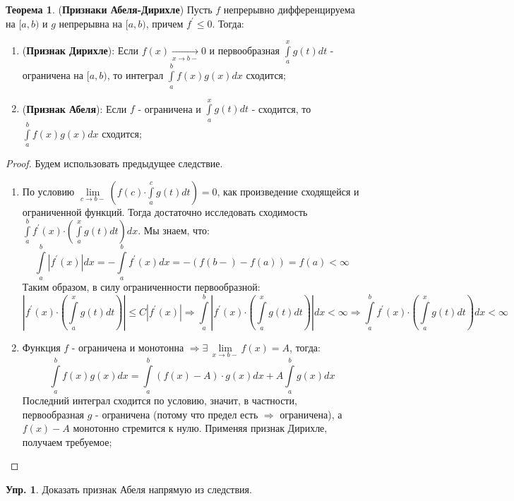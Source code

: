 \documentclass[12pt]{article}
\theoremstyle{definition}
\newtheorem{exrc}{Упр.}
\newtheorem{theorem}{Теорема}
\newcommand{\ddint}[2]{\displaystyle\int\limits_{#1}^{#2}}
\begin{document}
\begin{theorem}(\textbf{Признаки Абеля-Дирихле})
	Пусть $f$ непрерывно дифференцируема на $[a,b)$ и $g$ непрерывна на $[a,b)$, причем $f^\prime \leq 0$. Тогда:
	\begin{enumerate}[label ={\textbf{(\Roman*)}}]
		\item (\textbf{Признак Дирихле}): Если $f(x) \xrightarrow[x \to b-]{} 0$ и первообразная $\ddint{a}{x}g(t)dt$ - ограничена на $[a,b)$, то интеграл $\ddint{a}{b}f(x)g(x)dx$ сходится;
		
		\item (\textbf{Признак Абеля}): Если $f$ - ограничена и $\ddint{a}{x}g(t)dt$ - сходится, то $\ddint{a}{b}f(x)g(x)dx$ сходится;
	\end{enumerate}
\end{theorem}
\begin{proof} Будем использовать предыдущее следствие.
	\begin{enumerate}[label ={\textbf{(\Roman*)}}]
		\item По условию $\lim\limits_{c \to b-}\left(f(c){\cdot\!\!}\ddint{a}{c}g(t)dt\right) = 0$, как произведение сходящейся и ограниченной функций. Тогда достаточно исследовать сходимость $\ddint{a}{b}f^\prime(x){\cdot\!\!}\left(\ddint{a}{x}g(t)dt\right)dx$. Мы знаем, что: 
		$$
			\ddint{a}{b}\left|f^\prime(x)\right|dx = - \ddint{a}{b}f^\prime(x)dx = -\left(f(b-) - f(a)\right) = f(a) < \infty
		$$
		Таким образом, в силу ограниченности первообразной:
		$$
			\left|f^\prime(x){\cdot\!\!}\left(\ddint{a}{x}g(t)dt\right)\right| \leq C\left|f^\prime(x)\right| \Rightarrow \ddint{a}{b}\left|f^\prime(x){\cdot\!\!}\left(\ddint{a}{x}g(t)dt\right)\right|dx < \infty \Rightarrow \ddint{a}{b}f^\prime(x){\cdot\!\!}\left(\ddint{a}{x}g(t)dt\right)dx < \infty
		$$
		\item Функция $f$ - ограничена и монотонна $\Rightarrow \exists \, \lim\limits_{x \to b-}f(x) = A$, тогда:
		$$
			\ddint{a}{b}f(x)g(x)dx = \ddint{a}{b}\left(f(x) - A\right){\cdot}g(x)dx + A\ddint{a}{b}g(x)dx
		$$
		Последний интеграл сходится по условию, значит, в частности, первообразная $g$ - ограничена (потому что предел есть $\Rightarrow$ ограничена), а $f(x) - A$ монотонно стремится к нулю. Применяя признак Дирихле, получаем требуемое;
	\end{enumerate}
\end{proof}
\begin{exrc}
	Доказать признак Абеля напрямую из следствия.
\end{exrc}
\end{document}

